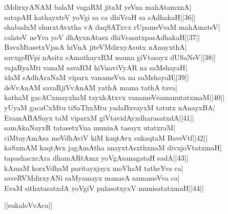 \documentclass{article}
\begin{document}
iMdirxyANAM balaM vagaRM jitaM yeVna mahAtamxnA|\\
satapAH kathayxteV yoVgi sa ca dhiVraH sa sAdhakaH||36||\\
shabadxM shurxtAvxtha vA daqSATxvx rUpameVvaM mahAmateV|\\
calateV neYva yoV dhAyxnAtasx dhiVrasatxpasAdhakaH||37||\\
BavaMtasetxVjasA hiVnA jiteVMdirxyAsutx nAnayxthA|\\
savxgeRVpi nAsitx sAmathayxRM mama giVtasayx dUSaNeV||38||\\
vajaRyaMti vanaM savaRM hiVnaviVyAR na saMshayaH|\\
idaM sAdhAraNaM viparx vanameVva na saMshayaH||39||\\
deVvAnAM savaRjiVvAnAM yathA mama tathA tava|\\
kathaM gacACxmayxhaM tayxkAtxvx vanameVvamanutatxmaM||40||\\
yUyaM gacaCxMtu tiSaThxMtu yadaBxvayxM tatutx nAnayxBA|\\
EvamABASayx taM viparxM giVtavidAyxdharasatxdA||41||\\
samAkaNayxR tatasetxVna muninA tasayx utatxraM|\\
ciMtayAmAsa meVdhAviV kiM kaqtAvx sukaqtaM BaveVtf||42||\\
kaSxmAM kaqtAvx jagAmAtha anayxtAsxthxnaM divxjoVtatxmaH|\\
tapashacxcAra dhamARtAmx yoVgAsanagataH sadA||43||\\
kAmaM korxVdhaM paritayxjayx moVhaM tatheYva ca|\\
saveRVMdirxyANi saMyamayx manasA samameVva ca|\\
EvaM sithxtasatxdA yoVgiV pulasotxyxV munisatatxmaH||44||\\

\begin{center}
||sukaloVvAca||
\end{center}
\end{document}
